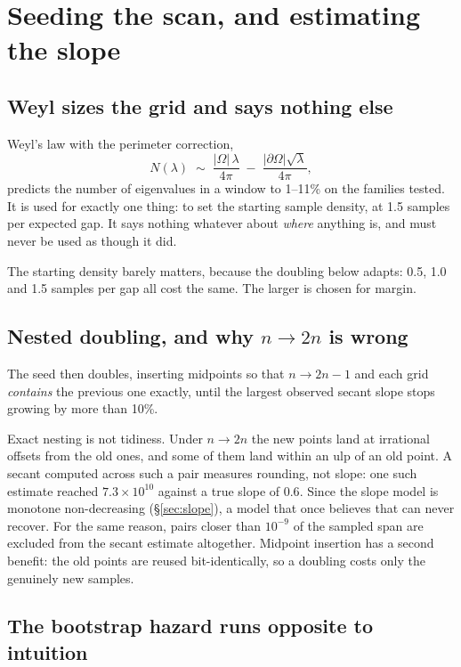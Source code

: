 \documentclass[11pt]{article}
\theoremstyle{definition}
\theoremstyle{remark}
\newcommand{\Om}{\Omega}
\newcommand{\lam}{\lambda}
\newcommand{\abs}[1]{\left\lvert #1 \right\rvert}
\begin{document}
\section{Seeding the scan, and estimating the slope}
\label{sec:seed}

\subsection{Weyl sizes the grid and says nothing else}

Weyl's law with the perimeter correction,
\begin{equation}\label{eq:weyl}
  N(\lam) \;\sim\; \frac{\abs{\Om}\,\lam}{4\pi} \;-\; \frac{\abs{\partial\Om}\sqrt{\lam}}{4\pi},
\end{equation}
predicts the number of eigenvalues in a window to 1--11\% on the families tested. It is used
for exactly one thing: to set the starting sample density, at 1.5 samples per expected gap. It
says nothing whatever about \emph{where} anything is, and must never be used as though it did.

The starting density barely matters, because the doubling below adapts: 0.5, 1.0 and 1.5
samples per gap all cost the same. The larger is chosen for margin.

\subsection{Nested doubling, and why $n\to 2n$ is wrong}

The seed then doubles, inserting midpoints so that $n\to 2n-1$ and each grid \emph{contains}
the previous one exactly, until the largest observed secant slope stops growing by more than
10\%.

Exact nesting is not tidiness. Under $n\to 2n$ the new points land at irrational offsets from
the old ones, and some of them land within an ulp of an old point. A secant computed across
such a pair measures rounding, not slope: one such estimate reached $7.3\times10^{10}$ against
a true slope of $0.6$. Since the slope model is monotone non-decreasing (\S\ref{sec:slope}), a
model that once believes that can never recover. For the same reason, pairs closer than
$10^{-9}$ of the sampled span are excluded from the secant estimate altogether. Midpoint
insertion has a second benefit: the old points are reused bit-identically, so a doubling costs
only the genuinely new samples.

\subsection{The bootstrap hazard runs opposite to intuition}
\label{sec:bootstrap}
\end{document}
